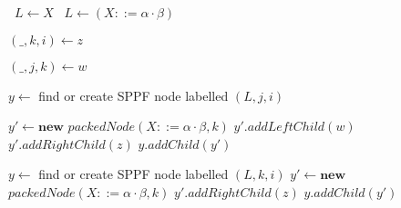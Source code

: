 \begin{algorithmic}   
    \State {}
    \Else
    
    \If{($\beta = \varepsilon$)}
    \  $L \gets X$
    \Else
    \  $L \gets (X ::=\alpha \cdot \beta)$
    \EndIf
    
    \State $(\_, k, i) \gets z$
    
    \State $(\_, j, k) \gets w$
    
    \State $y \gets$ find or create SPPF node labelled $(L, j, i)$  
    
    \State $y\prime \gets \textbf{new}$ $packedNode(X ::=\alpha \cdot \beta, k)$
    \State $y\prime.addLeftChild(w)$
    \State $y\prime.addRightChild(z)$
    \State $y.addChild(y\prime)$
    \EndIf
    
    \Else
    \State $y \gets$ find or create SPPF node labelled $(L, k, i)$ 
    \State $y\prime \gets \textbf{new}$ $packedNode(X ::=\alpha \cdot \beta, k)$
    \State $y\prime.addRightChild(z)$
    \State $y.addChild(y\prime)$
    \EndIf
    
    \EndIf
    
    \State {}
    \EndIf
    \EndFunction
\end{algorithmic}


